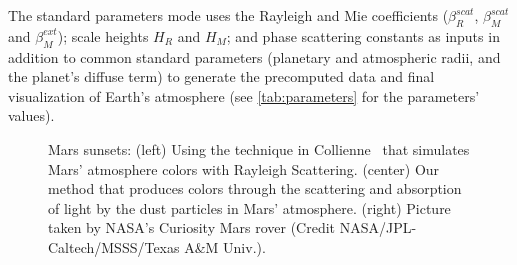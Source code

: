\documentclass[journal]{vgtc}                %
\begin{document}
The standard parameters mode uses the Rayleigh and Mie coefficients ($\beta_R^{scat}$, $\beta_M^{scat}$ and $\beta_M^{ext}$); scale heights $H_R$ and $H_M$; and phase scattering constants as inputs in addition to common standard parameters (planetary and atmospheric radii, and the planet's diffuse term) to generate the precomputed data and final visualization of Earth's atmosphere (see \autoref{tab:parameters} for the parameters' values). 
%
%
%
\begin{figure}
 \centering
 \vspace*{-4mm}
 \caption{Mars sunsets: (left) Using the technique in Collienne~\cite{Collienne:2013} that simulates Mars' atmosphere colors with Rayleigh Scattering. (center) Our method that produces colors through the scattering and absorption of light by the dust particles in Mars' atmosphere. (right) Picture taken by NASA's Curiosity Mars rover (Credit NASA/JPL-Caltech/MSSS/Texas A\&M Univ.).}
 \label{fig:Mars-Rover_and_Comp_Models}
\end{figure}
%
\end{document}

